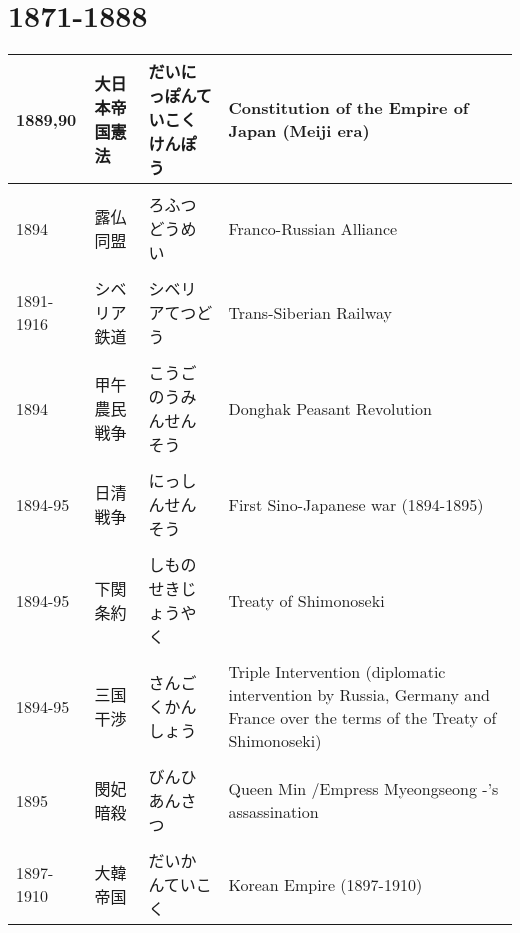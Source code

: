 \documentclass{article}
\begin{document}
\section{1871-1888}
\begin{tabular}{p{1.8cm} |p{3.0cm} | p{4.5cm} | p{8.5cm}}
1889,90 & 大日本帝国憲法 & だいにっぽんていこくけんぽう & Constitution of the Empire of Japan (Meiji era) \\ \hline \\[-1em]
1894 & 露仏同盟 & ろふつどうめい & Franco-Russian Alliance \\ \hline \\[-1em]
1891-1916 & シベリア鉄道 & シベリアてつどう & Trans-Siberian Railway \\ \hline \\[-1em]
1894 & 甲午農民戦争 &  こうごのうみんせんそう & Donghak Peasant Revolution \\ \hline \\[-1em]
1894-95 & 日清戦争 & にっしんせんそう & First Sino-Japanese war (1894-1895) \\ \hline \\[-1em]
1894-95 & 下関条約 & しものせきじょうやく & Treaty of Shimonoseki \\ \hline \\[-1em]
1894-95 & 三国干渉 &  さんごくかんしょう & Triple Intervention (diplomatic intervention by Russia, Germany and France over the terms of the Treaty of Shimonoseki) \\ \hline \\[-1em]
1895 & 閔妃暗殺	& びんひあんさつ  & Queen Min /Empress Myeongseong -'s assassination \\ \hline \\[-1em]
1897-1910 & 大韓帝国 &  だいかんていこく & Korean Empire (1897-1910) %
\end{tabular}
\end{document}
